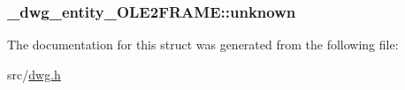 \hypertarget{struct__dwg__entity__OLE2FRAME_a0d9cc51fa6c25ee8b27e5bb01ef080e2}{
\subsubsection[{unknown}]{ {\bf \-\_\-dwg\-\_\-entity\-\_\-\-O\-L\-E2\-F\-R\-A\-M\-E\-::unknown}}}\label{struct__dwg__entity__OLE2FRAME_a0d9cc51fa6c25ee8b27e5bb01ef080e2}


\-The documentation for this struct was generated from the following file\-:\begin{DoxyCompactItemize}
\item 
src/\hyperlink{dwg_8h}{dwg.\-h}\end{DoxyCompactItemize}
